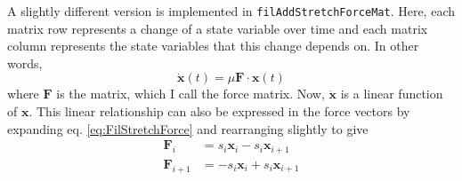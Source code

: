 \documentclass {scrbook}
\newcommand {\ttt} {\texttt}
\begin{document}
A slightly different version is implemented in \ttt{filAddStretchForceMat}. Here, each matrix row represents a change of a state variable over time and each matrix column represents the state variables that this change depends on. In other words,
$$\dot{\bm{x}}(t) = \mu \bm{F}\cdot \bm{x}(t)$$
where $\bm{F}$ is the matrix, which I call the force matrix. Now, $\dot{\bm{x}}$ is a linear function of $\bm{x}$. This linear relationship can also be expressed in the force vectors by expanding eq. \ref{eq:FilStretchForce} and rearranging slightly to give
\begin{align}
\bm{F}_{i} &= s_i \bm{x}_i - s_i \bm{x}_{i+1} \nonumber \\
\bm{F}_{i+1} &= - s_i \bm{x}_i + s_i \bm{x}_{i+1}
\label{eq:FilStretchForceMat}
\end{align}
\end{document}
